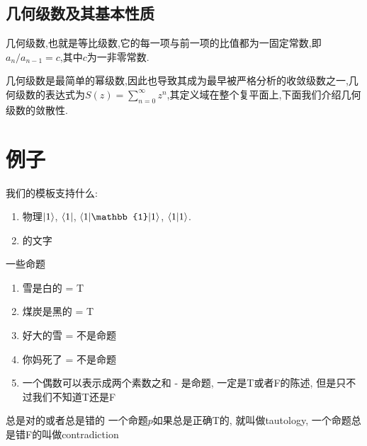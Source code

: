 \documentclass[zihao=-4,a4paper]{ctexart}
\begin{document}
\subsection{几何级数及其基本性质}

几何级数,也就是等比级数,它的每一项与前一项的比值都为一固定常数,即${a}_{n}/{a}_{n-1}=c$,其中$c$为一非零常数.

几何级数是最简单的幂级数,因此也导致其成为最早被严格分析的收敛级数之一,几何级数的表达式为$S\left(z\right)=\sum^{\infty}_{n=0}{z}^{n}$,其定义域在整个复平面上,下面我们介绍几何级数的敛散性.








\section{例子}
我们的模板支持什么:
\begin{enumerate}
	\item 物理$\ket{1}$, $\bra{1}$, $\mel**{1}{\mathbb{1}}{1}$, $\braket{1}$.
	\item {}的文字
\end{enumerate}
\begin{mexample}{一些命题}
	\begin{enumerate}
		\item 雪是白的 = T
		\item 煤炭是黑的 = T
		\item 好大的雪 = 不是命题
		\item 你妈死了 = 不是命题
		\item 一个偶数可以表示成两个素数之和 - 是命题, 一定是T或者F的陈述, 但是只不过我们不知道T还是F
	\end{enumerate}
\end{mexample}
\begin{mdefinition}{总是对的或者总是错的}
	一个命题$p$如果总是正确T的, 就叫做tautology, 一个命题总是错F的叫做contradiction
\end{mdefinition}
\end{document}
